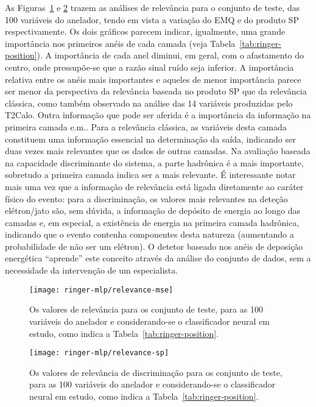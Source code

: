 As Figuras~\ref{fig:ringer-mse-relevance} e \ref{fig:ringer-sp-relevance}
trazem as análises de relevância para o conjunto de teste, das 100 variáveis
do anelador, tendo em vista a variação do EMQ e do produto SP
respectivamente. Os dois gráficos parecem indicar, igualmente, uma grande
importância nos primeiros anéis de cada camada (veja
Tabela~\ref{tab:ringer-position}). A importância de cada anel diminui, em
geral, com o afastamento do centro, onde pressupõe-se que a razão sinal ruído
seja inferior. A importância relativa entre os anéis mais importantes e
aqueles de menor importância parece ser menor da perspectiva da relevância
baseada no produto SP que da relevância clássica, como também observado na
análise das 14 variáveis produzidas pelo T2Calo. Outra informação que pode ser
aferida é a importância da informação na primeira camada e.m.. Para a
relevância clássica, as variáveis desta camada constituem uma informação
essencial na determinação da saída, indicando ser duas vezes mais relevantes
que os dados de outras camadas. Na avaliação baseada na capacidade
discriminante do sistema, a parte hadrônica é a mais importante, sobretudo a
primeira camada indica ser a mais relevante. É interessante notar mais uma vez
que a informação de relevância está ligada diretamente ao caráter físico do
evento: para a discriminação, os valores mais relevantes na deteção
elétron/jato são, sem dúvida, a informação de depósito de energia ao longo das
camadas e, em especial, a existência de energia na primeira camada hadrônica,
indicando que o evento contenha componentes desta natureza (aumentando a
probabilidade de não ser um elétron). O detetor baseado nos anéis de deposição
energética ``aprende'' este conceito através da análise do conjunto de dados,
sem a necessidade da intervenção de um especialista.

\begin{figure}
\begin{center}
\texttt{[image: ringer-mlp/relevance-mse]}
\end{center}
\caption{Os valores de relevância para os conjunto de teste, para as 100
variáveis do anelador e considerando-se o classificador neural em estudo, como
indica a Tabela~\ref{tab:ringer-position}.} 
\label{fig:ringer-mse-relevance}
\end{figure}

\begin{figure}
\begin{center}
\texttt{[image: ringer-mlp/relevance-sp]}
\end{center}
\caption{Os valores de relevância de discriminação para os conjunto de teste,
para as 100 variáveis do anelador e considerando-se o classificador neural em
estudo, como indica a Tabela~\ref{tab:ringer-position}.}
\label{fig:ringer-sp-relevance}
\end{figure}

